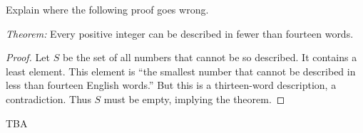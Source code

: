 \begin{problem}
Explain where the following proof goes wrong.

{\em Theorem:} Every positive integer can be described in fewer than
fourteen words.

\begin{proof}
  Let $S$ be the set of all numbers that cannot be so described. It
  contains a least element.  This element is ``the smallest number that
  cannot be described in less than fourteen English words.''  But this is
  a thirteen-word description, a contradiction.  Thus $S$ must be empty,
  implying the theorem.
\end{proof}

\begin{solution}

TBA

\end{solution}
\end{problem}

\endinput
